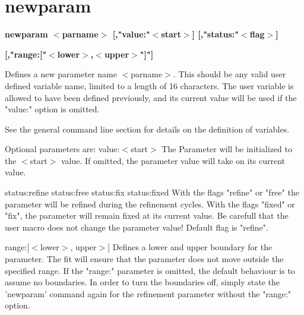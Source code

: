 \section{newparam}
{\bf newparam $ <$parname$> $ [,"value:"$ <$start$> $] [,"status:"$ <$flag$> $] \par }
{\bf                    [,"range:["$ <$lower$> $,$ <$upper$> $"]"] \par }
\par
\vspace{3pt}
Defines a new parameter name $ <$parname$> $. This should be any valid 
user defined variable name, limited to a length of 16 characters. 
The user variable is allowed to have been defined previously, 
and its current value will be used if the "value:" option is omitted. 
\par
See the general command line section for details on the definition 
of variables. 
\par
Optional parameters are: 
value:$ <$start$> $ 
   The Parameter will be initialized to the $ <$start$> $ value. 
   If omitted, the parameter value will take on its current value. 
\par
status:refine 
status:free 
status:fix 
status:fixed 
   With the flags "refine" or "free" the parameter will be refined 
   during the refinement cycles. 
   With the flags "fixed" or "fix", the parameter will remain fixed 
   at its current value. Be carefull that the user macro does not 
   change the parameter value! 
   Default flag is "refine". 
\par
range:[$ <$lower$> $, upper$> $] 
   Defines a lower and upper boundary for the parameter. The 
   fit will ensure that the parameter does not move outside the 
   specified range. 
   If the "range:" parameter is omitted, the default behaviour 
   is to assume no boundaries. 
   In order to turn the boundaries off, simply state the 
   'newparam' command again for the refinement parameter 
   without the "range:" option. 
